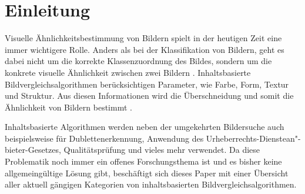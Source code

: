 \section{Einleitung}\label{einleitung}
Visuelle Ähnlichkeitsbestimmung von Bildern spielt in der heutigen Zeit eine
immer wichtigere Rolle. Anders als bei der Klassifikation von Bildern, geht es
dabei nicht um die korrekte Klassenzuordnung des Bildes, sondern um die konkrete 
visuelle Ähnlichkeit zwischen zwei Bildern \parencite{intro-classification}. 
Inhaltsbasierte Bildvergleichsalgorithmen berücksichtigen Parameter, wie Farbe,
Form, Textur und Struktur. Aus diesen Informationen wird die Überschneidung und
somit die Ähnlichkeit von Bildern bestimmt \parencite{intro-cibr}.

Inhaltsbasierte Algorithmen werden neben der umgekehrten Bildersuche
auch beispielsweise für Dublettenerkennung, Anwendung des
Urheberrechts-Dienstean"-bieter-Gesetzes, Qualitätsprüfung und vieles mehr
verwendet. Da diese Problematik noch immer ein offenes Forschungsthema ist und
es bisher keine allgemeingültige Lösung gibt, beschäftigt sich dieses Paper mit
einer Übersicht aller aktuell gängigen Kategorien von inhaltsbasierten
Bildvergleichsalgorithmen.
